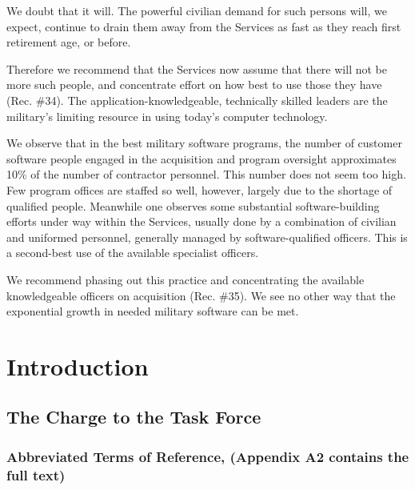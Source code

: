 \documentclass[12pt,final]{article}
\begin{document}
We doubt that it will. The powerful civilian demand for such persons will, we
expect, continue to drain them away from the Services as fast as they reach
first retirement age, or before. %

Therefore we recommend that the Services now assume that there will not be more
such people, and concentrate effort on how best to use those they have (Rec.
\#34). The application-knowledgeable, technically skilled leaders are the
military’s limiting resource in using today’s computer technology.

We observe that in the best military software programs, the number of customer
software people engaged in the acquisition and program oversight approximates
10\% of the number of contractor personnel. This number does not seem too high.
Few program offices are staffed so well, however, largely due to the shortage
of qualified people. Meanwhile one observes some substantial software-building
efforts under way within the Services, usually done by a combination of
civilian and uniformed personnel, generally managed by software-qualified
officers. This is a second-best use of the available specialist officers.

We recommend phasing out this practice and concentrating the available
knowledgeable officers on acquisition (Rec. \#35). We see no other way that the
exponential growth in needed military software can be met.

\section{Introduction}

\subsection{The Charge to the Task Force}

\subsubsection*{Abbreviated Terms of Reference, (Appendix A2 contains the full text)}
\end{document}
